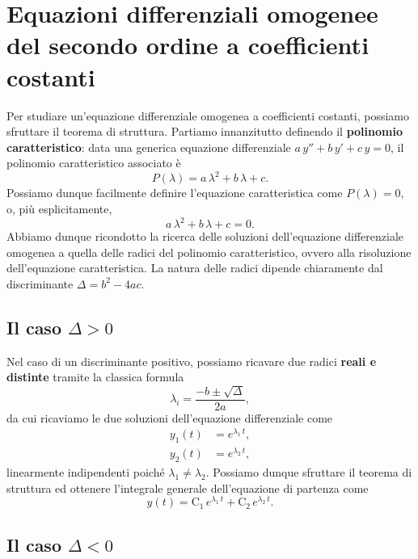\documentclass[../../analisi2]{subfiles}
\begin{document}
    \chapter{Equazioni differenziali omogenee del secondo ordine a coefficienti costanti}

        Per studiare un'equazione differenziale omogenea a coefficienti costanti, possiamo sfruttare il teorema di struttura.
        Partiamo innanzitutto definendo il \textbf{polinomio caratteristico}: data una generica equazione differenziale
        \(a \, y'' + b \, y' + c \, y = 0\), il polinomio caratteristico associato è
        \[
            P(\lambda) = a \, \lambda^2 + b \, \lambda + c.
        \]
        Possiamo dunque facilmente definire l'equazione caratteristica come \(P(\lambda) = 0\), o, più esplicitamente,
        \[
            a \, \lambda^2 + b \, \lambda + c = 0.
        \]
        Abbiamo dunque ricondotto la ricerca delle soluzioni dell'equazione differenziale omogenea a quella delle radici del
        polinomio caratteristico, ovvero alla risoluzione dell'equazione caratteristica. La natura delle radici dipende chiaramente
        dal discriminante \(\Delta = b^2 - 4ac\).

        \section{Il caso \texorpdfstring{\(\Delta > 0\)}{discriminante maggiore di zero}}

            Nel caso di un discriminante positivo, possiamo ricavare due radici \textbf{reali e distinte} tramite la classica formula
            \[
                \lambda_i = \frac{-b \pm \sqrt{\Delta}}{2a},
            \]
            da cui ricaviamo le due soluzioni dell'equazione differenziale come
            \begin{align*}
                y_1(t) &= e^{\lambda_1 \, t},\\
                y_2(t) &= e^{\lambda_2 \, t},
            \end{align*}
            linearmente indipendenti poiché \(\lambda_1 \neq \lambda_2\). Possiamo dunque sfruttare il teorema di struttura ed ottenere
            l'integrale generale dell'equazione di partenza come
            \[
                y(t) = \mathrm{C_1} \, e^{\lambda_1 \, t} + \mathrm{C_2} \, e^{\lambda_2 \, t}.
            \]

        \newpage

        \section{Il caso \texorpdfstring{\(\Delta < 0\)}{discriminante minore di zero}}
\end{document}
